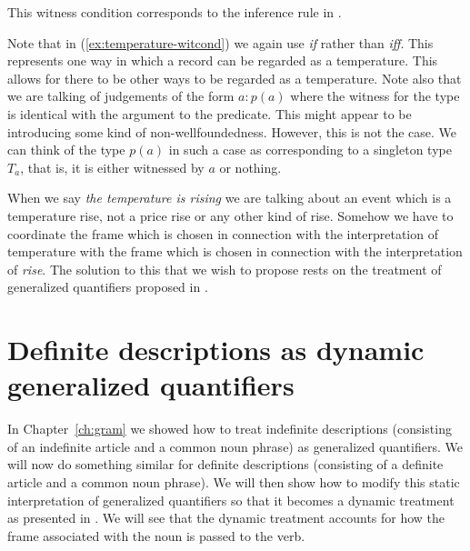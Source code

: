 This witness condition corresponds to the inference rule in \nexteg{}.
\begin{ex} 
  \begin{prooftree}
  \end{prooftree}
  
\end{ex} 
 Note that in (\ref{ex:temperature-witcond}) we again use \textit{if}
 rather than \textit{iff}.  This represents one way in which a record
 can be regarded as a temperature.  This allows for there to be other
 ways to be regarded as a temperature.  Note also that we are talking
 of judgements of the form $a:p(a)$ where the witness for the type is
 identical with the argument to the predicate.  This might appear to
 be introducing some kind of non-wellfoundedness.  However, this is
 not the case.  We can think of the type $p(a)$ in such a case as
 corresponding to a singleton type $T_a$, that is, it is either
 witnessed by $a$ or nothing.

When we say \textit{the temperature is
  rising} we are talking about an event which is a temperature rise,
not a price rise or any other kind of rise.  Somehow we have to
coordinate the frame which is chosen in connection with the
interpretation of temperature with the frame which is chosen in
connection with the interpretation of \textit{rise}.  The solution to
this that we wish to propose rests on the treatment of generalized
quantifiers proposed in \cite{Cooper2011,Cooper2013}. 

\section{Definite descriptions as dynamic generalized quantifiers}
\label{sec:dgqs}

In Chapter~\ref{ch:gram} we showed how to treat indefinite
descriptions (consisting of an indefinite article and a common noun
phrase) as generalized quantifiers.  We will now do something similar
for definite descriptions (consisting of a definite article and a
common noun phrase). We will then show how to modify this static
interpretation of generalized quantifiers so that it becomes a dynamic
treatment as presented in \cite{Cooper2011}.  We will see that the
dynamic treatment accounts for how the frame associated with the noun
is passed to the verb.

